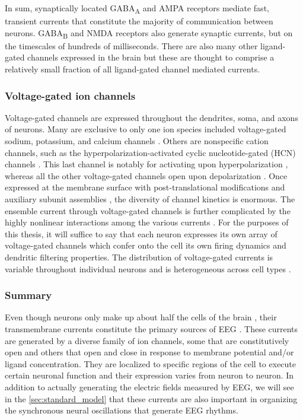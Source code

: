 In sum, synaptically located GABA\textsubscript{A} and AMPA receptors mediate fast, transient currents that constitute the majority of communication between neurons. GABA\textsubscript{B} and NMDA receptors also generate synaptic currents, but on the timescales of hundreds of milliseconds. There are also many other ligand-gated channels expressed in the brain but these are thought to comprise a relatively small fraction of all ligand-gated channel mediated currents.

\subsubsection{Voltage-gated ion channels} \label{sec:I_V}
Voltage-gated channels are expressed throughout the dendrites, soma, and axons of neurons. Many are exclusive to only one ion species included voltage-gated sodium, potassium, and calcium channels \cite{hille1992ionic}. Others are nonspecific cation channels, such as the hyperpolarization-activated cyclic nucleotide-gated (HCN) channels \cite{He2014}. This last channel is notably for activating upon hyperpolarization \cite{He2014}, whereas all the other voltage-gated channels open upon depolarization \cite{hille1992ionic}. Once expressed at the membrane surface with post-translational modifications \cite{Schulz2008} and auxiliary subunit assemblies \cite{Isom1994}, the diversity of channel kinetics is enormous. The ensemble current through voltage-gated channels is further complicated by the highly nonlinear interactions among the various currents \cite{Izhikevich2006}. For the purposes of this thesis, it will suffice to say that each neuron expresses its own array of voltage-gated channels which confer onto the cell its own firing dynamics and dendritic filtering properties. The distribution of voltage-gated currents is variable throughout individual neurons \cite{Lai2006} and is heterogeneous across cell types \cite{Berg2021,Scala2021}.

\subsubsection{Summary}
Even though neurons only make up about half the cells of the brain \cite{Azevedo2009}, their transmembrane currents constitute the primary sources of EEG \cite{Buzsaki2012}. These currents are generated by a diverse family of ion channels, some that are constitutively open and others that open and close in response to membrane potential and/or ligand concentration. They are localized to specific regions of the cell to execute certain neuronal function and their expression varies from neuron to neuron. In addition to actually generating the electric fields measured by EEG, we will see in the \autoref{sec:standard_model} that these currents are also important in organizing the synchronous neural oscillations that generate EEG rhythms.

